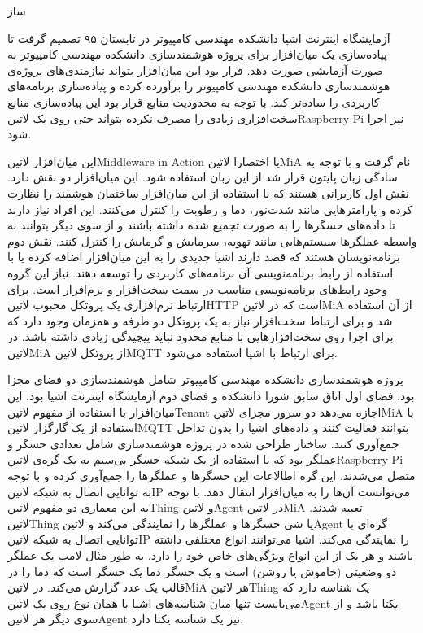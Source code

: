 \documentclass[]{assignment}
\begin{document}
‌ساز


آزمایشگاه اینترنت اشیا دانشکده مهندسی کامپیوتر در تابستان ۹۵ تصمیم گرفت تا پیاده‌سازی یک میان‌افزار برای پروژه هوشمند‌سازی دانشکده مهندسی کامپیوتر به صورت آزمایشی صورت دهد.
قرار بود این میان‌افزار بتواند نیازمندی‌های پروژه‌ی هوشمندسازی دانشکده مهندسی کامپیوتر را برآورده کرده و پیاده‌سازی برنامه‌های کاربردی را ساده‌تر کند.
با توجه به محدودیت منابع قرار بود این پیاده‌سازی منابع سخت‌افزاری
زیادی را مصرف نکرده بتواند حتی روی یک ‌لاتین{Raspberry Pi} نیز اجرا شود.

این میان‌افزار ‌لاتین{Middleware in Action} یا اختصارا ‌لاتین{MiA} نام گرفت و
با توجه به سادگی زبان پایتون قرار شد از این زبان استفاده شود.
این میان‌افزار دو نقش دارد. نقش اول کاربرانی هستند که با استفاده از این میان‌افزار ساختمان هوشمند را نظارت کرده و پارامترهایی مانند شدت‌نور،
دما و رطوبت را کنترل می‌کنند. این افراد نیاز دارند تا داده‌های حسگرها را به صورت تجمیع شده داشته باشند و از سوی دیگر بتوانند به واسطه عملگرها سیستم‌هایی مانند
تهویه، سرمایش و گرمایش را کنترل کنند.
نقش دوم برنامه‌نویسان هستند که قصد دارند اشیا جدیدی را به این میان‌افزار اضافه کرده یا با استفاده از رابط برنامه‌نویسی آن برنامه‌های کاربردی را توسعه دهند.
نیاز این گروه وجود رابط‌های برنامه‌نویسی مناسب در سمت سخت‌افزار و نرم‌افزار است. برای ارتباط نرم‌افزاری یک پروتکل محبوب ‌لاتین{HTTP} است که در
‌لاتین{MiA} از آن استفاده شد و برای ارتباط سخت‌افزار نیاز به یک پروتکل دو طرفه و همزمان وجود دارد که برای اجرا روی سخت‌افزارهایی با
منابع محدود نباید پیچیدگی زیادی داشته باشد. در ‌لاتین{MiA} از پروتکل ‌لاتین{MQTT} برای ارتباط با اشیا استفاده می‌شود.

پروژه هوشمند‌سازی دانشکده مهندسی کامپیوتر شامل هوشمند‌سازی دو فضای مجزا بود. فضای اول اتاق سابق شورا دانشکده و فضای دوم آزمایشگاه اینترنت اشیا بود.
این میان‌افزار با استفاده از مفهوم ‌لاتین{Tenant} اجازه می‌دهد دو سرور مجزای ‌لاتین{MiA} با استفاده از یک گارگزار ‌لاتین{MQTT}
بتوانند فعالیت کنند و داده‌های اشیا را بدون تداخل جمع‌آوری کنند.
ساختار طراحی شده در پروژه هوشمند‌سازی شامل تعدادی حسگر و عملگر بود که با استفاده از یک شبکه حسگر بی‌سیم به یک گره‌ی ‌لاتین{Raspberry Pi}
متصل می‌شدند. این گره اطالاعات این حسگرها و عملگرها را جمع‌آوری کرده و با توجه به توانایی اتصال به شبکه ‌لاتین{IP} می‌توانست آن‌ها را به میان‌افزار انتقال دهد.
با توجه به این معماری دو مفهوم ‌لاتین{Thing} و ‌لاتین{Agent} در ‌لاتین{MiA} تعبیه شدند. ‌لاتین{Thing} یا شی حسگرها و عملگرها را نمایندگی می‌کند
و ‌لاتین{Agent} گره‌ای با توانایی اتصال به شبکه ‌لاتین{IP} را نمایندگی می‌کند.
اشیا می‌توانند انواع مختلفی داشته باشند و هر یک از این انواع ویژگی‌های خاص خود را دارد. به طور مثال لامپ یک عملگر دو وضعیتی (خاموش یا روشن)
است و یک حسگر دما یک حسگر است که دما را در قالب یک عدد گزارش می‌کند.
در ‌لاتین{MiA} هر ‌لاتین{Thing} یک شناسه دارد که می‌بایست تنها میان شناسه‌های اشیا با همان نوع روی یک ‌لاتین{Agent} یکتا باشد و از سوی دیگر هر ‌لاتین{Agent} نیز یک شناسه
یکتا دارد.
\end{document}
